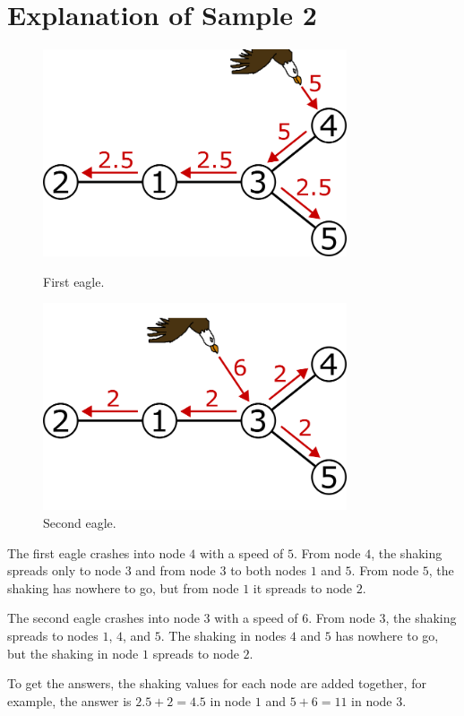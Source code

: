 \section*{Explanation of Sample 2}
\begin{figure}
  \centering
  \begin{minipage}{.5\textwidth}
    \centering
    \includegraphics[width=0.8\textwidth]{a}
    \caption{First eagle.}
    \label{fig:test1}
  \end{minipage}%
  \begin{minipage}{.5\textwidth}
    \centering
    \includegraphics[width=0.8\textwidth]{b}
    \caption{Second eagle.}
    \label{fig:test2}
  \end{minipage}
\end{figure}

The first eagle crashes into node $4$ with a speed of $5$.
From node $4$, the shaking spreads only to node $3$ and from node $3$ to both nodes $1$ and $5$.
From node $5$, the shaking has nowhere to go, but from node $1$ it spreads to node $2$.

The second eagle crashes into node $3$ with a speed of $6$.
From node $3$, the shaking spreads to nodes $1$, $4$, and $5$.
The shaking in nodes $4$ and $5$ has nowhere to go, but the shaking in node $1$ spreads to node $2$.

To get the answers, the shaking values for each node are added together, for example, the answer is $2.5+2=4.5$ in node $1$ and $5+6=11$ in node $3$.
